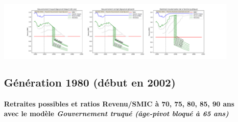 \begin{center}\includegraphics[width=0.9\textwidth]{fig/TechHosp_1975_22_dest_retraite.pdf}\end{center} \label{fig/TechHosp_1975_22_dest_retraite.pdf} 

\newpage 
 
\subsection{Génération 1980 (début en 2002)} 

\paragraph{Retraites possibles et ratios Revenu/SMIC à 70, 75, 80, 85, 90 ans avec le modèle \emph{Gouvernement truqué (âge-pivot bloqué à 65 ans)}}  
 

